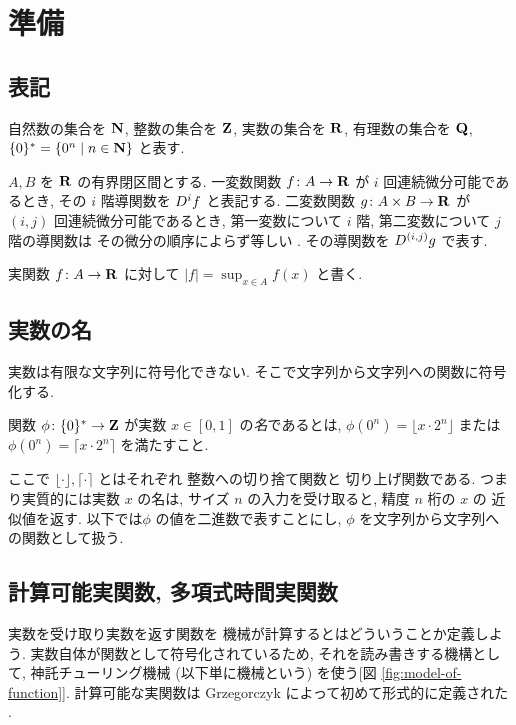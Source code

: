 \section{準備}
\label{section: preliminaries}

\subsection{表記}
自然数の集合を $\mathbf N$, 整数の集合を $\mathbf Z$, 実数の集合を $\mathbf R$, 
有理数の集合を $\mathbf Q$, $\{0\}^* = \{0^n \mid n \in \mathbf N\}$ と表す.

$A, B$ を $\mathbf R$ の有界閉区間とする. 一変数関数 $f\colon A \to \mathbf R$ が $i$ 回連続微分可能であるとき,
その $i$ 階導関数を $D ^i f$ と表記する.
二変数関数 $g \colon A \times B \to \mathbf R$ が
$(i, j)$ 回連続微分可能であるとき,
第一変数について $i$ 階, 第二変数について $j$ 階の導関数は
その微分の順序によらず等しい \cite{takagi1968analysis}.
その導関数を $D ^{(i,j)}g$ で表す.

実関数 $f \colon A \to \mathbf R$ に対して $|f| = \sup_{x \in A} f(x)$ と書く.

\subsection{実数の名}
 実数は有限な文字列に符号化できない. 
 そこで文字列から文字列への関数に符号化する.
 \begin{definition}[実数の名]
  関数 $\phi \colon \{0\}^* \to \mathbf Z $ が実数 $x \in [0,1]$ の\emph{名}であるとは,
  $\phi(0^n) = \lfloor x \cdot 2^n \rfloor$ または
  $\phi(0^n) = \lceil x \cdot 2^n \rceil$ を満たすこと.
 \end{definition}
ここで $\lfloor \cdot \rfloor, \lceil \cdot \rceil$ とはそれぞれ
整数への切り捨て関数と
切り上げ関数である.
つまり実質的には実数 $x$ の名は, 
サイズ $n$ の入力を受け取ると, 精度 $n$ 桁の $x$ の
近似値を返す.
以下では$\phi$ の値を二進数で表すことにし, 
$\phi$ を文字列から文字列への関数として扱う. 



\subsection{計算可能実関数, 多項式時間実関数}

実数を受け取り実数を返す関数を
機械が計算するとはどういうことか定義しよう. 
実数自体が関数として符号化されているため, 
それを読み書きする機構として, 
神託チューリング機械 (以下単に機械という) を使う[図 \ref{fig:model-of-function}].
計算可能な実関数は Grzegorczyk によって初めて形式的に定義された
\cite{grzegorczyk1955computable}.

